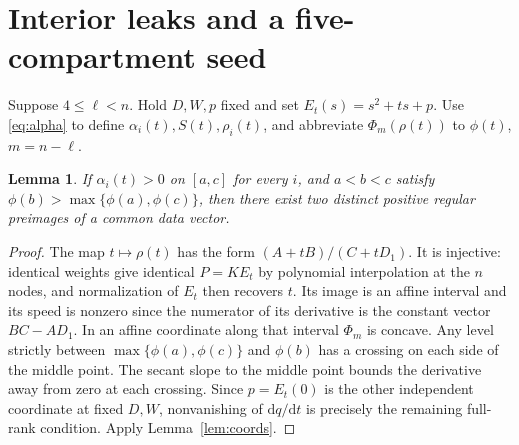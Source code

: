\documentclass[11pt,a4paper]{article}
\newtheorem{lemma}[theorem]{Lemma}
\newcommand{\dd}{\mathrm d}
\begin{document}
\section{Interior leaks and a five-compartment seed}
Suppose \(4\le\ell<n\). Hold \(D,W,p\) fixed and set \(E_t(s)=s^2+ts+p\).
Use \eqref{eq:alpha} to define \(\alpha_i(t),S(t),\rho_i(t)\), and abbreviate
\(\Phi_m(\rho(t))\) to \(\phi(t)\), \(m=n-\ell\).
\begin{lemma}\label{lem:peak}
If \(\alpha_i(t)>0\) on \([a,c]\) for every \(i\), and \(a<b<c\) satisfy
\(\phi(b)>\max\{\phi(a),\phi(c)\}\), then there exist two distinct positive
regular preimages of a common data vector.
\end{lemma}
\begin{proof}
The map \(t\mapsto\rho(t)\) has the form \((A+tB)/(C+tD_1)\). It is injective:
identical weights give identical \(P=KE_t\) by polynomial interpolation at
the \(n\) nodes, and normalization of \(E_t\) then recovers \(t\).
Its image is an affine interval and its speed is nonzero since the numerator
of its derivative is the constant vector \(BC-AD_1\). In an affine
coordinate along that interval \(\Phi_m\) is concave. Any level strictly
between \(\max\{\phi(a),\phi(c)\}\) and \(\phi(b)\) has a crossing on each
side of the middle point. The secant slope to the middle point bounds the
derivative away from zero at each crossing. Since \(p=E_t(0)\) is the other
independent coordinate at fixed \(D,W\), nonvanishing of \(\dd q/\dd t\)
is precisely the remaining full-rank condition. Apply Lemma~\ref{lem:coords}.
\end{proof}
\end{document}
